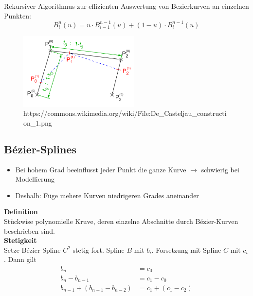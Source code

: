\documentclass[10pt,a4paper]{article}
\begin{document}
        Rekursiver Algorithmus zur effizienten Auswertung von Bezierkurven an einzelnen Punkten:
        $$B_i^n(u) = u \cdot B_{i-1}^{n-1} (u) + (1 - u) \cdot B_i^{n-1}(u)$$\vspace*{-0.5cm}
		\begin{figure}[h]
    		\centering
    		\includegraphics[width=6cm]{images/De_Casteljau_construction_1}
	    	\caption{https://commons.wikimedia.org/wiki/File:De\_Casteljau\_construction\_1.png}
        \end{figure}

        \subsection{Bézier-Splines}
        \label{kuf:sub:bezier-splines}
        
        \begin{itemize}
        	\item Bei hohem Grad beeinflusst jeder Punkt die ganze Kurve $\rightarrow$ schwierig bei Modellierung
        	\item Deshalb: Füge mehere Kurven niedrigeren Grades aneinander
        \end{itemize}
        \textbf{Definition}\\
        Stückwise polynomielle Kruve, deren einzelne Abschnitte durch Bézier-Kurven beschrieben sind.\\

        \textbf{Stetigkeit}\\
        Setze Bézier-Spline $C^2$ stetig fort. Spline $B$ mit $b_i$.
        Forsetzung mit Spline $C$ mit $c_i$. Dann gilt
        \begin{align*}
          b_n &= c_0\\
          b_n - b_{n-1} &= c_1 - c_0\\
          b_{n-1} + (b_{n-1} -  b_{n-2}) &= c_1 + (c_1 - c_2)
        \end{align*}
\end{document}
